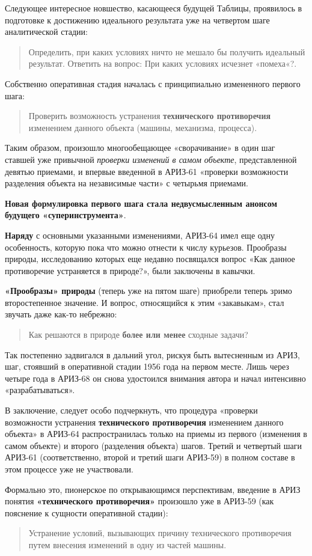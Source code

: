 \documentclass[11pt,a4paper]{article}
\begin{document}
Следующее интересное новшество, касающееся будущей Таблицы, проявилось в
подготовке к достижению идеального результата уже на четвертом шаге
аналитической стадии:
\begin{quote}
  Определить, при каких условиях ничто не мешало бы получить идеальный
  результат. Ответить на вопрос: При каких условиях исчезнет «помеха«?.
\end{quote}
Собственно оперативная стадия началась с принципиально измененного первого
шага:
\begin{quote}
  Проверить возможность устранения \textbf{технического противоречия}
  изменением данного объекта (машины, механизма, процесса).
\end{quote}
Таким образом, произошло многообещающее «сворачивание» в один шаг ставшей уже
привычной \emph{проверки изменений в самом объекте}, представленной девятью
приемами, и впервые введенной в АРИЗ-61 «проверки возможности разделения
объекта на независимые части» с четырьмя приемами.

\textbf{Новая формулировка первого шага стала недвусмысленным анонсом будущего
  «суперинструмента»}.

\textbf{Наряду} с основными указанными изменениями, АРИЗ-64 имел еще одну
особенность, которую пока что можно отнести к числу курьезов. Прообразы
природы, исследованию которых еще недавно посвящался вопрос «Как данное
противоречие устраняется в природе?», были заключены в кавычки.

\textbf{«Прообразы» природы} (теперь уже на пятом шаге) приобрели теперь зримо
второстепенное значение. И вопрос, относящийся к этим «закавыкам», стал
звучать даже как-то небрежно:
\begin{quote}
  Как решаются в природе \textbf{более или менее} сходные задачи?
\end{quote}
Так постепенно задвигался в дальний угол, рискуя быть вытесненным из АРИЗ,
шаг, стоявший в оперативной стадии 1956 года на первом месте. Лишь через
четыре года в АРИЗ-68 он снова удостоился внимания автора и начал интенсивно
«разрабатываться».

В заключение, следует особо подчеркнуть, что процедура «проверки возможности
устранения \textbf{технического противоречия} изменением данного объекта» в
АРИЗ-64 распространилась только на приемы из первого (изменения в самом
объекте) и второго (разделения объекта) шагов. Третий и четвертый шаги АРИЗ-61
(соответственно, второй и третий шаги АРИЗ-59) в полном составе в этом
процессе уже не участвовали.

Формально это, пионерское по открывающимся перспективам, введение в АРИЗ
понятия \textbf{«технического противоречия»} произошло уже в АРИЗ-59 (как
пояснение к сущности оперативной стадии):
\begin{quote}
  Устранение условий, вызывающих причину технического противоречия путем
  внесения изменений в одну из частей машины.
\end{quote}
\end{document}
